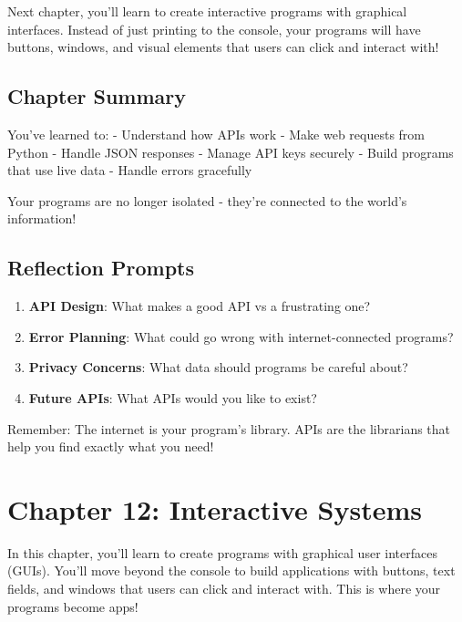 \documentclass[
  letterpaper,
  DIV=11,
  numbers=noendperiod,
  oneside]{scrreprt}
\providecommand{\tightlist}{%
  \setlength{\itemsep}{0pt}\setlength{\parskip}{0pt}}\usepackage{longtable,booktabs,array}
\begin{document}
Next chapter, you'll learn to create interactive programs with graphical
interfaces. Instead of just printing to the console, your programs will
have buttons, windows, and visual elements that users can click and
interact with!

\section{Chapter Summary}\label{chapter-summary-13}

You've learned to: - Understand how APIs work - Make web requests from
Python - Handle JSON responses - Manage API keys securely - Build
programs that use live data - Handle errors gracefully

Your programs are no longer isolated - they're connected to the world's
information!

\section{Reflection Prompts}\label{reflection-prompts-1}

\begin{enumerate}
\def\labelenumi{\arabic{enumi}.}
\tightlist
\item
  \textbf{API Design}: What makes a good API vs a frustrating one?
\item
  \textbf{Error Planning}: What could go wrong with internet-connected
  programs?
\item
  \textbf{Privacy Concerns}: What data should programs be careful about?
\item
  \textbf{Future APIs}: What APIs would you like to exist?
\end{enumerate}

Remember: The internet is your program's library. APIs are the
librarians that help you find exactly what you need!

\chapter{Chapter 12: Interactive Systems}\label{sec-interactive-systems}

\begin{tcolorbox}[enhanced jigsaw, opacityback=0, colback=white, colframe=quarto-callout-note-color-frame, breakable, titlerule=0mm, coltitle=black, rightrule=.15mm, colbacktitle=quarto-callout-note-color!10!white, left=2mm, bottomtitle=1mm, bottomrule=.15mm, title=\textcolor{quarto-callout-note-color}{\faInfo}\hspace{0.5em}{Chapter Summary}, opacitybacktitle=0.6, toptitle=1mm, leftrule=.75mm, arc=.35mm, toprule=.15mm]

In this chapter, you'll learn to create programs with graphical user
interfaces (GUIs). You'll move beyond the console to build applications
with buttons, text fields, and windows that users can click and interact
with. This is where your programs become apps!

\end{tcolorbox}
\end{document}
